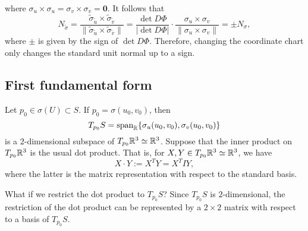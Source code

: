 where $\sigma_u \times \sigma_u = \sigma_v \times \sigma_v = \mathbf 0$. 
It follows that 
\[ N_{\tilde\sigma} = \frac{\tilde\sigma_{\tilde u} \times \tilde\sigma_{\tilde v}}
{\|\tilde\sigma_{\tilde u} \times \tilde\sigma_{\tilde v}\|}
= \frac{\det D\Phi}{\lvert\det D\Phi\rvert} \cdot \frac{\sigma_u \times \sigma_v}
{\|\sigma_u \times \sigma_v\|} = \pm N_\sigma, \] 
where $\pm$ is given by the sign of $\det D\Phi$. Therefore, changing the 
coordinate chart only changes the standard unit normal up to a sign. 

\subsection{First fundamental form} \label{subsec:3.1}
Let $p_0 \in \sigma(U) \subset S$. If $p_0 = \sigma(u_0, v_0)$, then 
\[ T_{p_0}S = \operatorname{span}_{\mathbb{R}}\{\sigma_u(u_0, v_0), \sigma_v(u_0, v_0)\} \] 
is a $2$-dimensional subspace of $T_{p_0}\mathbb{R}^3 \simeq \mathbb{R}^3$. Suppose that 
the inner product on $T_{p_0}\mathbb{R}^3$ is the usual dot product. That is, 
for $X, Y \in T_{p_0}\mathbb{R}^3 \simeq \mathbb{R}^3$, we have 
\[ X \cdot Y := X^T Y = X^TIY, \] 
where the latter is the matrix representation with respect to the standard basis.

What if we restrict the dot product to $T_{p_0}S$? Since $T_{p_0}S$ is 
$2$-dimensional, the restriction of the dot product can be represented 
by a $2\times 2$ matrix with respect to a basis of $T_{p_0}S$. 

